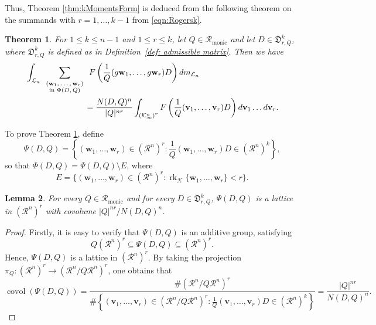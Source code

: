 \documentclass[11pt,a4paper,reqno]{amsart}
\newcommand{\Rmo}{\mathcal R_{\text{monic}}}
\newtheorem{theorem}{Theorem}[section]
\newtheorem{lemma}[theorem]{Lemma}
\theoremstyle{definition}
\theoremstyle{remark}
\numberwithin{equation}{section}
\begin{document}
Thus, Theorem \ref{thm:kMomentsForm} is deduced from the following theorem on the summands with $r=1,\dots,k-1$ from \eqref{eqn:Rogersk}. 
\begin{theorem}
\label{thm:rPart}
    For $1\leq k\leq n-1$ and $1\leq r\leq k$, let $Q\in \Rmo$ and let $D\in \mathfrak{D}^k_{r,Q}$, where $\mathfrak{D}^k_{r,Q}$ is defined as in Definition~\ref{def: admissible matrix}. Then we have
    \begin{equation}\label{eq: rPart}
    \begin{split}
        &\int_{\mathcal{L}_n}\sum_{\scriptsize \begin{array}{c} (\mathbf{w}_1,\dots,\mathbf{w}_r)\\
        \text{in }\Phi(D,Q)\end{array}}F\left(\frac{1}{Q}(g\mathbf{w}_1,\dots,g\mathbf{w}_r)D\right)dm_{\mathcal{L}_n}\\
        &\hspace{1in}=\frac{N(D,Q)^n}{\vert Q\vert^{nr}}\int_{\left(\mathcal{K}_{\infty}^n\right)^r}F\left(\frac{1}{Q}(\mathbf{v}_1,\dots,\mathbf{v}_r)D\right)d\mathbf{v}_1\dots d\mathbf{v}_r.
    \end{split}
    \end{equation}
\end{theorem}
To prove Theorem \ref{thm:rPart}, define
    \begin{equation}\label{Def: Psi}\Psi(D,Q)=\left\{(\mathbf{w}_1,\dots,\mathbf{w}_r)\in \left(\mathcal{R}^n\right)^r:\frac{1}{Q}(\mathbf{w}_1,\dots,\mathbf{w}_r)D\in \left(\mathcal{R}^n\right)^k\right\},\end{equation}
    so that $\Phi(D,Q)=\Psi(D,Q)\setminus E$, where
        $$E=\{(\mathbf{w}_1,\dots,\mathbf{w}_r)\in(\mathcal{R}^n)^r:\operatorname{rk}_{\mathcal{K}}\{\mathbf{w}_1,\dots,\mathbf{w}_r\}<r\}.$$
        
\begin{lemma}
\label{lem:Psi(D,Q)Covol}
    For every $Q\in \Rmo$ and for every $D\in \mathfrak{D}^k_{r,Q}$, $\Psi(D,Q)$ is a lattice in $(\mathcal{R}^n)^r$ with covolume $|Q|^{nr}/N(D,Q)^n$. 
\end{lemma}
\begin{proof}
    Firstly, it is easy to verify that $\Psi(D,Q)$ is an additive group, satisfying $$Q(\mathcal{R}^n)^r\subseteq \Psi(D,Q)\subseteq (\mathcal{R}^n)^r.$$ 
    Hence, $\Psi(D,Q)$ is a lattice in $(\mathcal{R}^n)^r$. By taking the projection $\pi_Q: (\mathcal{R}^n)^r\rightarrow(\mathcal{R}^n/Q\mathcal{R}^n)^r$, one obtains that 
    \begin{equation*}
        \operatorname{covol}(\Psi(D,Q))=\frac{\#(\mathcal{R}^n/Q\mathcal{R}^n)^r}{\#\left\{(\mathbf{v}_1,\dots,\mathbf{v}_r)\in (\mathcal{R}^n/Q\mathcal{R}^n)^r:\frac{1}{Q}(\mathbf{v}_1,\dots,\mathbf{v}_r)D\in (\mathcal{R}^n)^k\right\}}=\frac{\vert Q\vert^{nr}}{N(D,Q)^n}.
    \end{equation*}
\end{proof}
\end{document}
